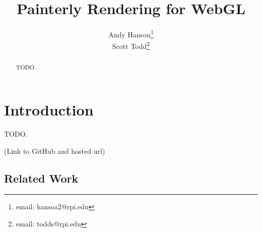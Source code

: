 \documentclass[conference]{acmsiggraph}
\title{Painterly Rendering for WebGL}
\author{Andy Hanson\thanks{email: hansoa2@rpi.edu}\\
        Scott Todd\thanks{email: todds@rpi.edu}}
\begin{document}

\maketitle

\begin{abstract}

TODO.

\end{abstract}



\keywordlist


\TOGlinkslist


\copyrightspace

\section{Introduction}

TODO.

(Link to GitHub and hosted url)

\subsection{Related Work}
\end{document}
